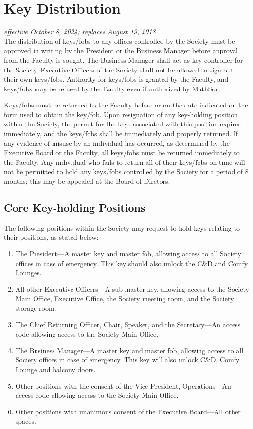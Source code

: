 \section{Key Distribution}
\emph{effective October 8, 2024; replaces August 19, 2018}\\

The distribution of keys/fobs to any offices controlled by the Society must be
approved in writing by the President or the Business Manager before
approval from the Faculty is sought. The Business Manager shall act
as key controller for the Society. Executive Officers of the Society shall not
be allowed to sign out their own keys/fobs. Authority for keys/fobs is granted
by the Faculty, and keys/fobs may be refused by the Faculty even if authorized
by MathSoc.

Keys/fobs must be returned to the Faculty before or on the date indicated on
the form used to obtain the key/fob. Upon resignation of any key-holding
position within the Society, the permit for the keys associated with this
position expires immediately, and the keys/fobs shall be immediately and
properly returned. If any evidence of misuse by an individual has occurred, as
determined by the Executive Board or the Faculty, all keys/fobs must be
returned immediately to the Faculty. Any individual who fails to return all of
their keys/fobs on time will not be permitted to hold any keys/fobs controlled
by the Society for a period of 8 months; this may be appealed at the Board of 
Diretors.

\subsection{Core Key-holding Positions}
The following positions within the Society may request to hold keys relating to
their positions, as stated below:
\begin{enumerate}
    \item The President---A master key and master fob, allowing access to all
        Society offices in case of emergency. This key should also unlock the C\&D
        and Comfy Lounges.
    \item All other Executive Officers---A sub-master key, allowing access to the
        Society Main Office, Executive Office, the Society meeting room, and the Society storage room.
    \item The Chief Returning Officer, Chair, Speaker, and the Secretary---An access code
        allowing access to the Society Main Office.
    \item The Business Manager---A master key and master fob, allowing access to all
        Society offices in case of emergency. This key will also unlock C\&D, Comfy Lounge and balcony doors.
    \item Other positions with the consent of the Vice President, Operations---An access code allowing access to the Society Main Office.
    \item Other positions with unanimous consent of the Executive Board---All other spaces.
\end{enumerate}

